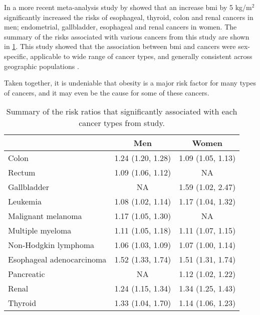 In a more recent meta-analysis study by \citet{Renehan2008} showed that an increase \gls{bmi} by 5 kg/m$^2$ significantly increased the risks of esophageal, thyroid, colon and renal cancers in men; endometrial, gallbladder, esophageal and renal cancers in women.
The summary of the risks associated with various cancers from this study are shown in \cref{tab:renehan_cancer_risks}.
This study showed that the association between \gls{bmi} and cancers were sex-specific, applicable to wide range of cancer types, and generally consistent across geographic populations \citep{Renehan2008,Roberts2010}.

Taken together, it is undeniable that obesity is a major risk factor for many types of cancers, and it may even be the cause for some of these cancers.

\begin{table}[h]
	\centering
	\begin{threeparttable}
		\caption{Summary of the risk ratios that significantly associated with each cancer types from \citet{Renehan2008} study.}
		\label{tab:renehan_cancer_risks}
		\begin{tabular}{lcc}
													   & Men               & Women\\
			\hline
			\rule{0pt}{2.25ex}Colon                 & 1.24 (1.20, 1.28) & 1.09 (1.05, 1.13)\\
			Rectum                                  & 1.09 (1.06, 1.12) & NA\tnote{3}\\
			Gallbladder                             & NA                & 1.59 (1.02, 2.47)\\
			Leukemia                                & 1.08 (1.02, 1.14) & 1.17 (1.04, 1.32)\\
			Malignant melanoma                      & 1.17 (1.05, 1.30) & NA\\
			Multiple myeloma                        & 1.11 (1.05, 1.18) & 1.11 (1.07, 1.15)\\
			Non-Hodgkin lymphoma                    & 1.06 (1.03, 1.09) & 1.07 (1.00, 1.14)\\
			Esophageal adenocarcinoma               & 1.52 (1.33, 1.74) & 1.51 (1.31, 1.74)\\
			Pancreatic                              & NA                & 1.12 (1.02, 1.22)\\
			Renal                                   & 1.24 (1.15, 1.34) & 1.34 (1.25, 1.43)\\
			Thyroid                                 & 1.33 (1.04, 1.70) & 1.14 (1.06, 1.23)\\

\end{tabular}
\end{threeparttable}
\end{table}

